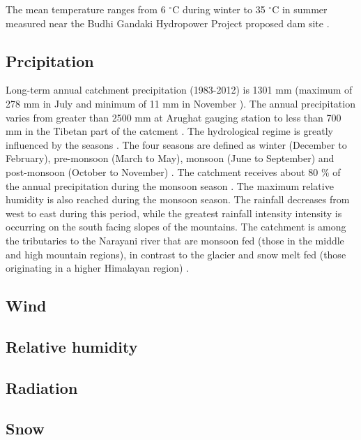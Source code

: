 The mean temperature ranges from 6 $^{\circ}$C during winter to 35 $^{\circ}$C in summer measured near the Budhi Gandaki Hydropower Project proposed dam site \parencite{devkota_climate_2017}. 

\subsection{Prcipitation}
Long-term annual catchment precipitation (1983-2012) is 1301 mm (maximum of 278 mm in July and minimum of 11 mm in November \parencite{marahatta_application_2021}). The annual precipitation varies from greater than 2500 mm at Arughat gauging station to less than 700 mm in the Tibetan part of the catcment \parencite{marahatta_hydrological_2021}. The hydrological regime is greatly influenced by the seasons \parencite{bhattarai2020evaluation}. The four seasons are defined as winter (December to February), pre-monsoon (March to May), monsoon (June to September) and post-monsoon (October to November) \parencite{shrestha1999maximum, bhattarai2019aerosol}. The catchment receives about 80 $\%$ of the annual precipitation during the monsoon season \parencite{khatri2018modelling}. The maximum relative humidity is also reached during the monsoon season. The rainfall decreases from west to east during this period, while the greatest rainfall intensity intensity is occurring on the south facing slopes of the mountains. The catchment is among the tributaries to the Narayani river that are monsoon fed (those in the middle and high mountain regions), in contrast to the glacier and snow melt fed (those originating in a higher Himalayan region) \parencite{bhattarai2020evaluation}.

\subsection{Wind}

\subsection{Relative humidity}

\subsection{Radiation}

\subsection{Snow}

